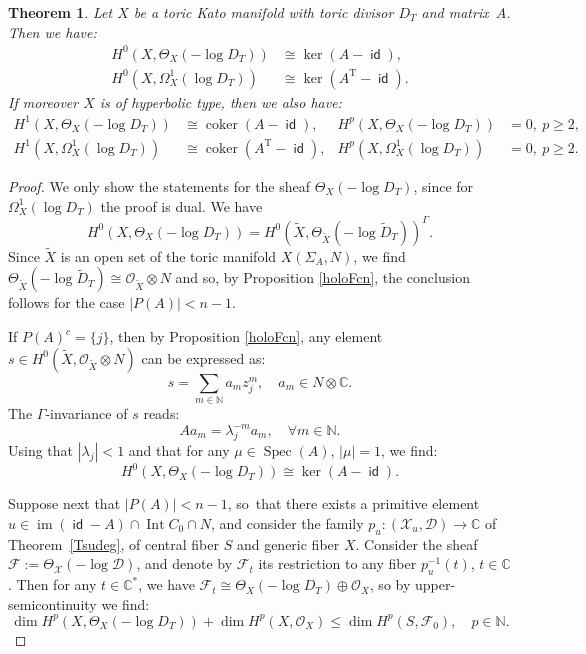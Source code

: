 \documentclass[JEP,XML,SOM,Unicode,NoFloatCountersInSection]{cedram}
\let\mathcal\mathscr
\newtheorem{theorem}{Theorem}[section]
\theoremstyle{definition}
\let\wt\widetilde
\let\la\lambda
\newcommand{\CC}{\mathbb{C}}
\newcommand{\NN}{\mathbb{N}}
\newcommand{\Oo}{\mathcal{O}}
\DeclareMathOperator{\coker}{coker}
\DeclareMathOperator{\id}{\mathsf{id}}
\DeclareMathOperator{\im}{im}
\DeclareMathOperator{\Int}{Int}
\DeclareMathOperator{\Spec}{Spec}
\newcommand{\transp}[1]{{#1}^{\scriptscriptstyle\mathrm{T}}}
\begin{document}
\begin{theorem}\label{cohDT}
Let $X$ be a toric Kato manifold with toric divisor $D_T$ and matrix~$A$. Then we have:
\begin{align*}
H^0(X,\Theta_X(-\log D_T))&\cong \ker(A-\id),\\
H^0(X,\Omega_X^1(\log D_T))&\cong \ker(\transp{A}-\id).
\end{align*}
If moreover $X$ is of hyperbolic type, then we also have:
\begin{align*}
H^1(X,\Theta_X(-\log D_T))&\cong \coker(A-\id), &H^p(X,\Theta_X(-\log D_T))&=0, \ p\geq 2,\\
H^1(X,\Omega_X^1(\log D_T))&\cong \coker(\transp{A}-\id), & H^p(X,\Omega_X^1(\log D_T))&=0, \ p\geq 2.
\end{align*}
\end{theorem}
\begin{proof}
We only show the statements for the sheaf $\Theta_X(-\log D_T)$, since for $\Omega_X^1(\log D_T)$ the proof is dual. We have
\begin{equation*}
H^0(X,\Theta_X(-\log D_T))=H^0(\wt{X},\Theta_{\wt{X}}(-\log \wt{D}_T))^{\Gamma}.
\end{equation*}
Since $\wt{X}$ is an open set of the toric manifold $X(\Sigma_A,N)$, we find $\Theta_{\wt{X}}(-\log \wt{D}_T)\cong \Oo_{\wt{X}}\otimes N$ and so, by Proposition \ref{holoFcn}, the conclusion follows for the case $|P(A)|<n-1$.

If $P(A)^c=\{j\}$, then by Proposition \ref{holoFcn}, any element $s\in H^0(\wt{X},\Oo_{\wt{X}}\otimes N)$ can be expressed as:
\begin{equation*}
s=\sum_{m\in\NN}a_mz_j^m, \quad a_m\in N\otimes\CC.
\end{equation*}
The $\Gamma$-invariance of $s$ reads:
\begin{equation*}
Aa_m=\la_j^{-m}a_m, \quad \forall m\in\NN.
\end{equation*}
Using that $|\la_j|<1$ and that for any $\mu\in\Spec(A)$, $|\mu|=1$, we find:
\begin{equation*}
H^0(X,\Theta_X(-\log D_T))\cong\ker(A-\id).
\end{equation*}

Suppose next that $|P(A)|<n-1$, so~that there exists a primitive element $u\in\im(\id-A)\cap \Int C_0\cap N$, and consider the family $p_u:(\mathcal X_u, \mathcal D)\to \CC$ of Theorem~\ref{Tsudeg}, of central fiber $S$ and generic fiber $X$. Consider the sheaf $\mathcal F:=\Theta_{\mathcal X}(-\log\mathcal D)$, and denote by $\mathcal F_t$ its restriction to any fiber $p_u^{-1}(t)$, $t\in\CC$. Then for any $t\in\CC^*$, we have $\mathcal F_t\cong\Theta_X(-\log D_T)\oplus \Oo_X$, so by upper-semicontinuity \cite[Th.\,4.12]{bs} we find:
\begin{equation}\label{semicDT}
\dim H^p(X,\Theta_X(-\log D_T))+\dim H^p(X,\Oo_X)\leq \dim H^p(S,\mathcal F_0), \quad p\in\NN.
\end{equation}


\end{proof}
\end{document}

